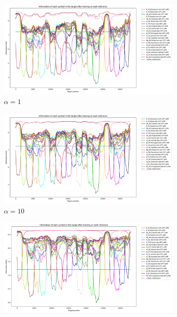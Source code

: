 \documentclass{article}
\begin{document}
\begin{figure}
    \begin{subfigure}[b]{0.3\textwidth}
        \begin{center}
            \includegraphics[width=1.0\linewidth]{../results/all_languages/-p_c:1:3.png}
        \end{center}
        \caption{$\alpha = 1$}
        \label{fig:all_languages_p_c:1:3_again}
    \end{subfigure}
    \hfill
    \begin{subfigure}[b]{0.3\textwidth}
        \begin{center}
            \includegraphics[width=1.0\linewidth]{../results/all_languages/-p_c:10:3.png}
        \end{center}
        \caption{$\alpha = 10$}
        \label{fig:all_languages_p_c:10:3}
    \end{subfigure}
    \hfill
    \begin{subfigure}[b]{0.3\textwidth}
        \begin{center}
            \includegraphics[width=1.0\linewidth]{../results/all_languages/-p_c:100:3.png}

\end{center}
\end{subfigure}
\end{figure}
\end{document}
